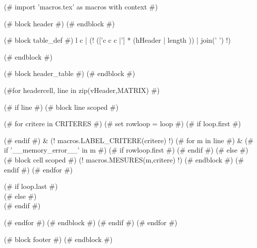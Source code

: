 (# import 'macros.tex' as macros with context #)

(# block header #)
(# endblock #)


\setlength\tabcolsep{0.07cm}
\begin{longtable}
    (# block table_def #){ l c | (! (['c c c |'] *  (hHeader | length )) | join(' ') !) }
    (# endblock #)



    (# block header_table #)
    (# endblock #)


    \endfirsthead
    \endhead
    \endfoot
    \endlastfoot

    (#for headercell, line in zip(vHeader,MATRIX) #)

    (# if line #)
    \hline
    (# block line scoped #)

    (# for critere in CRITERES #)
    (# set rowloop = loop #)
    (# if loop.first #)


    (# endif #)
    & (! macros.LABEL_CRITERE(critere) !)
    (# for m in line #)
    &
    (# if '__memory_error__' in m #)
    (# if rowloop.first #)  (# endif #)
    (# else #)
    (# block cell scoped #)
    (! macros.MESURES(m,critere) !)
    (# endblock #)
    (# endif #)
    (# endfor #)

    (# if loop.last #) \\ (# else #) \\* (# endif #)

    (# endfor #)
    (# endblock #)
    (# endif #)
    (# endfor #)
    \hline
    \caption{\textbf{(! title !)}. (! description !)}
    \label{tab:(! label !)}
\end{longtable}


(# block footer #)
(# endblock #)
